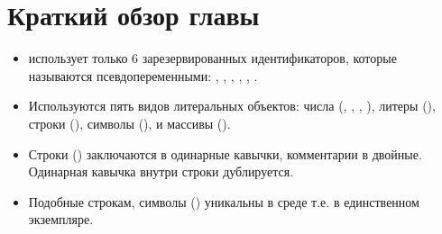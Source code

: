 \documentclass[a4paper,10pt,twoside]{book}
\begin{document}
\section{Краткий обзор главы}

\begin{itemize}


\item 	\pharo использует только 6 зарезервированных идентификаторов,
	которые называются псевдопеременными:
	, , , , , .


\item	Используются пять видов литеральных объектов:
	числа (, , , ),
	литеры (), строки (),
	символы (),
	и массивы ().


\item 	Строки () заключаются в одинарные кавычки, комментарии в двойные.
	Одинарная кавычка внутри строки дублируется.


\item	Подобные строкам, символы () уникальны в среде т.е. в единственном экземпляре.


\end{itemize}
\end{document}
